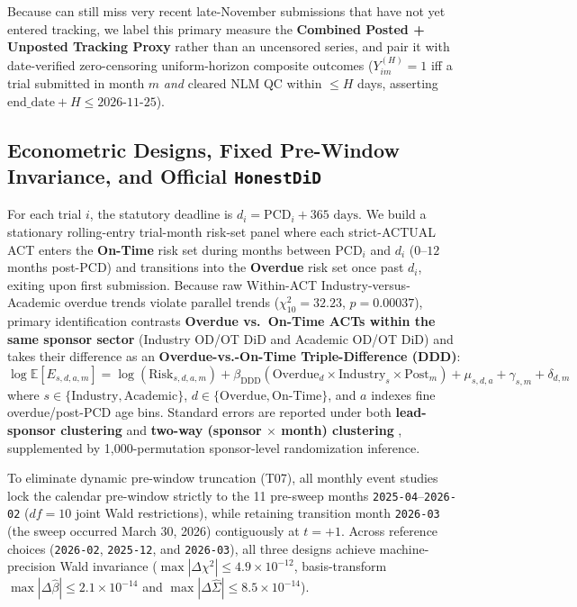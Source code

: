 \documentclass[11pt,letterpaper]{article}
\begin{document}
Because  can still miss very recent late-November submissions that have not yet entered tracking, we label this primary measure the \textbf{Combined Posted + Unposted Tracking Proxy} rather than an uncensored series, and pair it with date-verified zero-censoring uniform-horizon composite outcomes ($Y_{im}^{(H)}=1$ iff a trial submitted in month $m$ \textit{and} cleared NLM QC within $\le H$ days, asserting $\text{end\_date}+H\le\text{2026-11-25}$).

\subsection{Econometric Designs, Fixed Pre-Window Invariance, and Official \texttt{HonestDiD}}
For each trial $i$, the statutory deadline is $d_i=\text{PCD}_i+365\text{ days}$. We build a stationary rolling-entry trial-month risk-set panel where each strict-ACTUAL ACT enters the \textbf{On-Time} risk set during months between $\text{PCD}_i$ and $d_i$ ($0$--$12$ months post-PCD) and transitions into the \textbf{Overdue} risk set once past $d_i$, exiting upon first submission. Because raw Within-ACT Industry-versus-Academic overdue trends violate parallel trends ($\chi^2_{10}=32.23$, $p=0.00037$), primary identification contrasts \textbf{Overdue vs.\ On-Time ACTs within the same sponsor sector} (Industry OD/OT DiD and Academic OD/OT DiD) and takes their difference as an \textbf{Overdue-vs.-On-Time Triple-Difference (DDD)}:
\begin{equation}
\log \mathbb{E}[E_{s,d,a,m}] = \log(\mathrm{Risk}_{s,d,a,m}) + \beta_{\mathrm{DDD}}(\mathrm{Overdue}_d \times \mathrm{Industry}_s \times \mathrm{Post}_m) + \mu_{s,d,a} + \gamma_{s,m} + \delta_{d,m}
\end{equation}
where $s\in\{\text{Industry},\text{Academic}\}$, $d\in\{\text{Overdue},\text{On-Time}\}$, and $a$ indexes fine overdue/post-PCD age bins. Standard errors are reported under both \textbf{lead-sponsor clustering} and \textbf{two-way (sponsor $\times$ month) clustering} \citep{cameron2011}, supplemented by 1,000-permutation sponsor-level randomization inference.

To eliminate dynamic pre-window truncation (T07), all monthly event studies lock the calendar pre-window strictly to the 11 pre-sweep months \texttt{2025-04}--\texttt{2026-02} ($df=10$ joint Wald restrictions), while retaining transition month \texttt{2026-03} (the sweep occurred March 30, 2026) contiguously at $t=+1$. Across reference choices (\texttt{2026-02}, \texttt{2025-12}, and \texttt{2026-03}), all three designs achieve machine-precision Wald invariance ($\max|\Delta\chi^2|\le 4.9\times 10^{-12}$, basis-transform $\max|\Delta\hat{\beta}|\le 2.1\times 10^{-14}$ and $\max|\Delta\hat{\Sigma}|\le 8.5\times 10^{-14}$).
\end{document}
